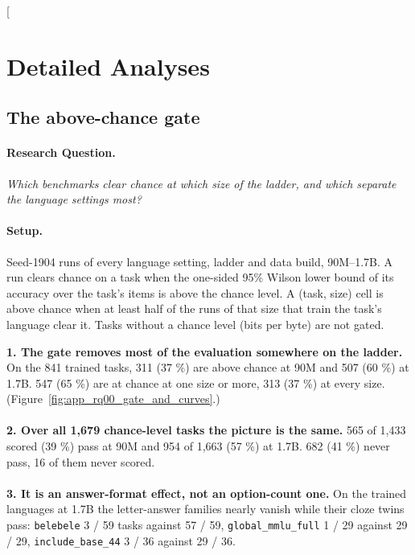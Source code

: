 \clearpage
\twocolumn[{%
\section{Detailed Analyses}
\label{app:analyses}

\subsection{The above-chance gate}
\label{app:rq00_gate_and_curves}

\noindent\begin{minipage}[t]{0.485\textwidth}
\vspace{0pt}
\paragraph{Research Question.} \emph{Which benchmarks clear chance at which size of the ladder, and which separate the language settings most?}

\paragraph{Setup.} Seed-1904 runs of every language setting, ladder and data build, 90M--1.7B. A run clears chance on a task when the one-sided 95\% Wilson lower bound of its accuracy over the task's items is above the chance level. A (task, size) cell is above chance when at least half of the runs of that size that train the task's language clear it. Tasks without a chance level (bits per byte) are not gated.
\end{minipage}\hfill
\begin{minipage}[t]{0.485\textwidth}
\vspace{0pt}
\begin{rqfinding}
\textbf{1. The gate removes most of the evaluation somewhere on the ladder.} On the 841 trained tasks, 311 (37 \%) are above chance at 90M and 507 (60 \%) at 1.7B. 547 (65 \%) are at chance at one size or more, 313 (37 \%) at every size. (Figure~\ref{fig:app_rq00_gate_and_curves}.)
\\
\\
\textbf{2. Over all 1,679 chance-level tasks the picture is the same.} 565 of 1,433 scored (39 \%) pass at 90M and 954 of 1,663 (57 \%) at 1.7B. 682 (41 \%) never pass, 16 of them never scored.
\\
\\
\textbf{3. It is an answer-format effect, not an option-count one.} On the trained languages at 1.7B the letter-answer families nearly vanish while their cloze twins pass: \texttt{belebele} 3 / 59 tasks against 57 / 59, \texttt{global\_mmlu\_full} 1 / 29 against 29 / 29, \texttt{include\_base\_44} 3 / 36 against 29 / 36.
\end{rqfinding}
\end{minipage}

}
